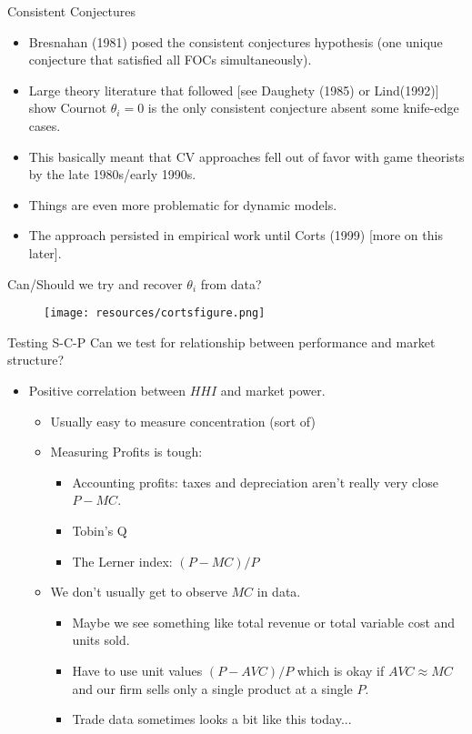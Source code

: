 \documentclass[aspectratio=169,11pt]{beamer}
\begin{document}
\begin{frame}{Consistent Conjectures}
\begin{itemize}
\item Bresnahan (1981) posed the consistent conjectures hypothesis (one unique conjecture that satisfied all FOCs simultaneously).
\item Large theory literature that followed [see Daughety (1985) or Lind(1992)] show Cournot $\theta_i=0$ is the only consistent conjecture absent some knife-edge cases.
\item This basically meant that CV approaches fell out of favor with game theorists by the late 1980s/early 1990s.
\item Things are even more problematic for dynamic models.
\item The approach persisted in empirical work until Corts (1999) [more on this later].
\end{itemize}
\end{frame}

\begin{frame}{Can/Should we try and recover $\theta_i$ from data?}
\begin{figure}
\begin{center}
\texttt{[image: resources/cortsfigure.png]}
\end{center}
\end{figure}
\end{frame}



\begin{frame}{Testing S-C-P }
Can we test for relationship between performance and market structure?
\begin{itemize}
\item Positive correlation between $HHI$ and market power.
\begin{itemize}
\item Usually easy to measure concentration (sort of)
\item Measuring Profits is tough:
\begin{itemize}
\item Accounting profits: taxes and depreciation aren't really very close $P-MC$.
\item Tobin's Q
\item The Lerner index: $(P-MC)/P$
\end{itemize}
\item We don't usually get to observe $MC$ in data.

\begin{itemize}
\item Maybe we see something like total revenue or total variable cost and units sold.
\item Have to use unit values $(P-AVC)/P$ which is okay if $AVC \approx MC$ and our firm sells only a single product at a single $P$.
\item Trade data sometimes looks a bit like this today...
\end{itemize}
\end{itemize}
\end{itemize}
\end{frame}
\end{document}

